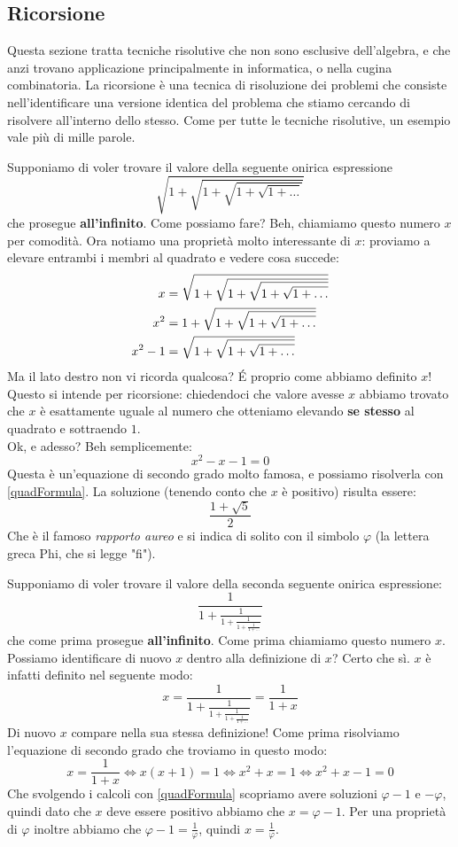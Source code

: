 \documentclass[11pt]{scrartcl}
\begin{document}
	\subsection{Ricorsione}
	Questa sezione tratta tecniche risolutive che non sono esclusive dell'algebra, e che anzi trovano applicazione principalmente in informatica, o nella cugina combinatoria.
	La ricorsione è una tecnica di risoluzione dei problemi che consiste nell'identificare una versione identica del problema che stiamo cercando di risolvere all'interno dello stesso. Come per tutte le tecniche risolutive, un esempio vale più di mille parole.
	\begin{example}
		Supponiamo di voler trovare il valore della seguente onirica espressione
		$$\sqrt{1+\sqrt{1+\sqrt{1+\sqrt{1+\dots}}}}$$
		che prosegue \textbf{all'infinito}. Come possiamo fare? Beh, chiamiamo questo numero $x$ per comodità. Ora notiamo una proprietà molto interessante di $x$: proviamo a elevare entrambi i membri al quadrato e vedere cosa succede:
		\begin{align}\notag
			x     & = \sqrt{1+\sqrt{1+\sqrt{1+\sqrt{1+\dots}}}} \\ \notag
			x^2   & = 1 + \sqrt{1+\sqrt{1+\sqrt{1+\dots}}} \\ \notag
			x^2-1 & = \sqrt{1+\sqrt{1+\sqrt{1+\dots}}}\notag
		\end{align}
		Ma il lato destro non vi ricorda qualcosa? \'E proprio come abbiamo definito $x$! \\
		Questo si intende per ricorsione: chiedendoci che valore avesse $x$ abbiamo trovato che $x$ è esattamente uguale al numero che otteniamo elevando \textbf{se stesso} al quadrato e sottraendo $1$.\\
		Ok, e adesso? Beh semplicemente:
		$$x^2-x-1=0$$ 
		Questa è un'equazione di secondo grado molto famosa, e possiamo risolverla con \ref{quadFormula}. La soluzione (tenendo conto che $x$ è positivo) risulta essere:
		$$\frac{1+\sqrt{5}}{2}$$
		Che è il famoso \emph{rapporto aureo} e si indica di solito con il simbolo $\varphi$ (la lettera greca Phi, che si legge "fi").
	\end{example}
	\begin{example}
		Supponiamo di voler trovare il valore della seconda seguente onirica espressione:
		$$\frac{1}{1+\frac{1}{1+\frac{1}{1+\frac{1}{1+\dots}}}}$$
		che come prima prosegue \textbf{all'infinito}. Come prima chiamiamo questo numero $x$. Possiamo identificare di nuovo $x$ dentro alla definizione di $x$? Certo che sì. $x$ è infatti definito nel seguente modo:
		$$x=\frac{1}{1+\frac{1}{1+\frac{1}{1+\frac{1}{1+\dots}}}}=\frac{1}{1+x}$$
		Di nuovo $x$ compare nella sua stessa definizione! Come prima risolviamo l'equazione di secondo grado che troviamo in questo modo:
		$$x=\frac{1}{1+x}\iff x(x+1)=1 \iff x^2+x=1 \iff x^2+x-1=0$$
		Che svolgendo i calcoli con \ref{quadFormula} scopriamo avere soluzioni $\varphi-1$ e $-\varphi$, quindi dato che $x$ deve essere positivo abbiamo che $x=\varphi-1$. Per una proprietà di $\varphi$ inoltre abbiamo che $\varphi-1=\frac{1}{\varphi}$, quindi $x=\frac{1}{\varphi}$.
	\end{example}
	\newpage
\end{document}
